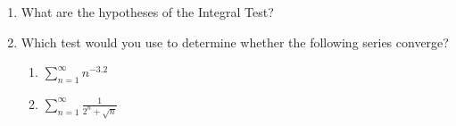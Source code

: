 \documentclass{nosvagor-notes}
\begin{document}
\begin{enumerate}
  \item What are the hypotheses of the Integral Test?
  \vspace{110pt}

  \item Which test would you use to determine whether the following series converge?
  \begin{enumerate}
    \item \(\displaystyle \sum_{n=1}^{\infty} n^{-3.2}\)
  \vspace{110pt}

    \item \(\displaystyle \sum_{n=1}^{\infty} \frac{1}{2^n + \sqrt{n} }\)
  \vspace{110pt}
  \end{enumerate}

\end{enumerate}
\end{document}
